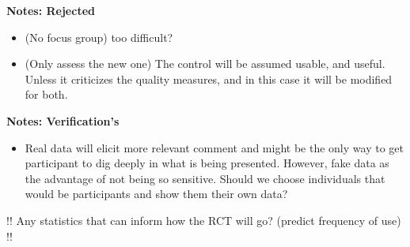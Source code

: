 \textbf{Notes: Rejected}
\begin{itemize}
    \item (No focus group) too difficult?
    \item (Only assess the new one) The control will be assumed usable, and useful. Unless it criticizes the quality measures, and in this case it will be modified for both.
\end{itemize}

\textbf{Notes: Verification's}
\begin{itemize}
    \item Real data will elicit more relevant comment and might be the only way to get participant to dig deeply in what is being presented. However, fake data as the advantage of not being so sensitive. Should we choose individuals that would be participants and show them their own data?
\end{itemize}

!! Any statistics that can inform how the RCT will go? (predict frequency of use) !!